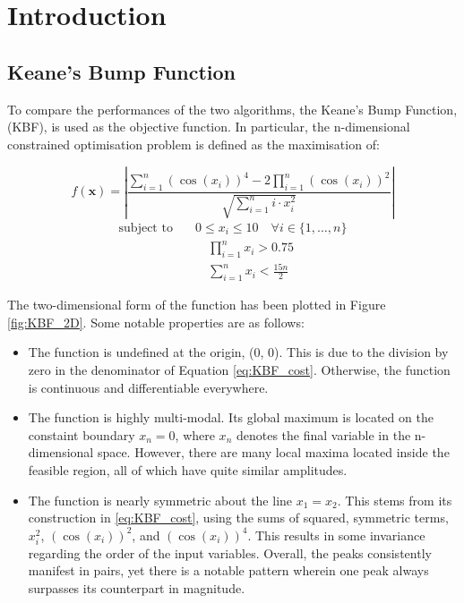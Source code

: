 \documentclass[10pt]{article}
\begin{document}
\section{Introduction}
\begin{multicols}{2}
\subsection{Keane's Bump Function}
To compare the performances of the two algorithms, the Keane's Bump Function, (KBF), is used as the objective function. In particular, the n-dimensional constrained optimisation problem is defined as the maximisation of:

\begin{equation}
    f(\mathbf{x}) = \left| \frac{\sum_{i=1}^{n} (\cos(x_i))^4 - 2\prod_{i=1}^{n} (\cos(x_i))^2}{\sqrt{\sum_{i=1}^{n} i \cdot x_i^2}} \right|
    \label{eq:KBF_cost}
\end{equation}
\begin{equation}
    \begin{aligned}
        \text{subject to} \quad & 0 \leq x_i \leq 10 \quad \forall i \in \{1, \dots, n\} \\
        & \quad \prod_{i=1}^{n} x_i > 0.75 \\
        & \quad \sum_{i=1}^{n} x_i < \frac{15n}{2}
    \end{aligned} 
    \label{eq:KBF_constraints}
\end{equation}

The two-dimensional form of the function has been plotted in Figure \ref{fig:KBF_2D}. Some notable properties are as follows:

\begin{itemize}
    \item The function is undefined at the origin, (0, 0). This is due to the division by zero in the denominator of Equation \ref{eq:KBF_cost}. Otherwise, the function is continuous and differentiable everywhere.
    \item The function is highly multi-modal. Its global maximum is located on the constaint boundary $x_{n}=0$, where $x_n$ denotes the final variable in the n-dimensional space. However, there are many local maxima located inside the feasible region, all of which have quite similar amplitudes.
    \item The function is nearly symmetric about the line $x_1=x_2$. This stems from its construction in \ref{eq:KBF_cost}, using the sums of squared, symmetric terms, $x_i^2$, $(\cos(x_i))^2$, and $(\cos(x_i))^4$. This results in some invariance regarding the order of the input variables. Overall, the peaks consistently manifest in pairs, yet there is a notable pattern wherein one peak always surpasses its counterpart in magnitude.
\end{itemize}


\end{multicols}
\end{document}
